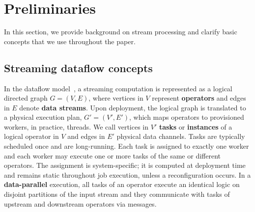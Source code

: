 \section{Preliminaries}\label{sec:background}
In this section, we provide background on stream processing and clarify basic concepts that we use throughout the paper. 

\subsection{Streaming dataflow concepts}\label{sec:streaming-dataflows}

In the dataflow model~\cite{Akidau2015,carbone2020beyond}, a streaming computation is represented as a logical directed  graph $G=(V,E)$, where vertices in $V$ represent \textbf{operators} and edges in $E$ denote \textbf{data streams}. Upon deployment, the logical graph is translated to a physical execution plan, $G'=(V', E')$, which maps operators to provisioned workers, in practice, threads. We call vertices in $V'$ \textbf{tasks} or \textbf{instances} of a logical operator in $V$ and edges in $E'$ physical data channels.
Tasks are typically scheduled once and are long-running.
Each task is assigned to exactly one worker and each worker may execute one or more tasks of the same or different operators. The assignment is system-specific; it is computed at deployment time and remains static throughout job execution, unless a reconfiguration occurs. In a \textbf{data-parallel} execution, all tasks of an operator execute an identical logic on disjoint partitions of the input stream and they communicate  with tasks of upstream and downstream operators via  messages. 
